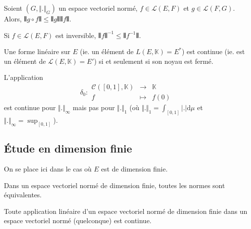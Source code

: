   \begin{proposition}
    Soient $(G, \Vert . \Vert_G)$ un espace vectoriel normé, $f \in \mathcal{L}(E,F)$ et $g \in \mathcal{L}(F,G)$. Alors, $\VERT g \circ f \VERT \leq \VERT g \VERT \VERT f \VERT$.
  \end{proposition}

  \begin{proposition}
    Si $f \in \mathcal{L}(E,F)$ est inversible, $\VERT f \VERT^{-1} \leq \VERT f^{-1} \VERT$.
  \end{proposition}

  \begin{proposition}
    Une forme linéaire sur $E$ (ie. un élément de $L(E, \mathbb{K}) = E^*$) est continue (ie. est un élément de $\mathcal{L}(E, \mathbb{K}) = E'$) si et seulement si son noyau est fermé.
  \end{proposition}


  \begin{example}
    L'application
    \[
    \delta_0 : \begin{array}{ccc}
      \mathcal{C}([0,1], \mathbb{K}) &\rightarrow& \mathbb{K} \\
      f &\mapsto& f(0)
    \end{array}
    \]
    est continue pour $\Vert . \Vert_\infty$ mais pas pour $\Vert . \Vert_1$ (où $\Vert . \Vert_1 = \int_{[0,1]} \vert . \vert \mathrm{d}\mu$ et $\Vert . \Vert_\infty = \sup_{[0,1]}$).
  \end{example}

  \subsection{Étude en dimension finie}

  On se place ici dans le cas où $E$ est de dimension finie.
  

  \begin{theorem}
    Dans un espace vectoriel normé de dimension finie, toutes les normes sont équivalentes.
  \end{theorem}

  \begin{corollary}
    Toute application linéaire d'un espace vectoriel normé de dimension finie dans un espace vectoriel normé (quelconque) est continue.
  \end{corollary}

